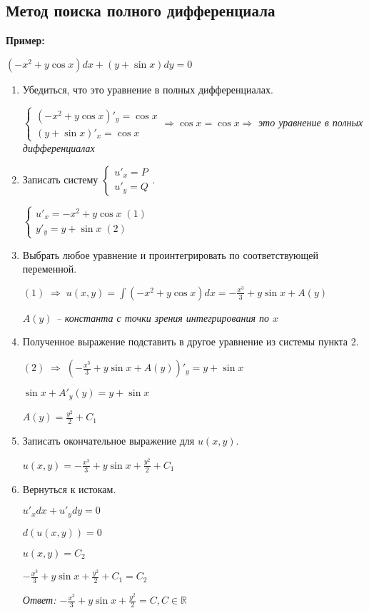 \documentclass[10pt, a4paper]{article}
\begin{document}
\subsection{Метод поиска полного дифференциала}
\textbf{Пример:}
\par $(-x^2 + y\cos{x})dx + (y + \sin{x})dy = 0$
\begin{enumerate}
    \item Убедиться, что это уравнение в полных дифференциалах.
        \par
            $\begin{cases}
                (-x^2 + y\cos{x})'_y = \cos{x} \\
                (y + \sin{x})'_x = \cos{x}
            \end{cases}
            \Rightarrow
            \cos{x} = \cos{x}
            \Rightarrow$
            \textit{это уравнение в полных дифференциалах}
    \item Записать систему $\begin{cases}
                               u'_x = P \\
                               u'_y = Q
                            \end{cases}$.
        \par
            $\begin{cases}
                u'_x = -x^2 + y\cos{x} \; (1) \\
                y'_y = y + \sin{x} \; (2)
            \end{cases}$
    \item Выбрать любое уравнение и проинтегрировать по соответствующей переменной.
        \par $(1) \; \Rightarrow \; u(x, y) = \int{(-x^2 +y\cos{x})}dx = -\frac{x^3}{3} + y\sin{x} + A(y)$
        \par \textit{$A(y)$ -- константа с точки зрения интегрирования по $x$}
    \item Полученное выражение подставить в другое уравнение из системы пункта 2.
        \par $(2) \; \Rightarrow \; (-\frac{x^3}{3} + y\sin{x} + A(y))'_y = y + \sin{x}$
        \par $\sin{x} + A'_y(y) = y + \sin{x}$
        \par $A(y) = \frac{y^2}{2} + C_1$
    \item Записать окончательное выражение для $u(x, y)$.
        \par $u(x, y) = -\frac{x^3}{3} + y\sin{x} + \frac{y^2}{2} + C_1$
    \item Вернуться к истокам.
        \par $u'_xdx + u'_ydy = 0$
        \par $d(u(x, y)) = 0$
        \par $u(x, y) = C_2$
        \par $-\frac{x^3}{3} + y\sin{x} + \frac{y^2}{2} + C_1 = C_2$
        \par\textit{Ответ: $-\frac{x^3}{3} + y\sin{x} + \frac{y^2}{2} = C, C \in \mathbb{R}$}
\end{enumerate}
\end{document}

